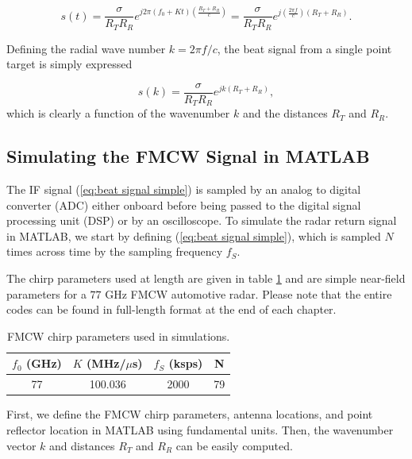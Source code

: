 \begin{equation}
	s(t) = \frac{\sigma}{R_T R_R} e^{j2\pi(f_0 + Kt)(\frac{R_T + R_R}{c})} = \frac{\sigma}{R_T R_R} e^{j(\frac{2\pi f}{c})(R_T + R_R)}.
\end{equation}

Defining the radial wave number $k = 2\pi f/c$, the beat signal from a single point target is simply expressed

\begin{equation}
	\label{eq:beat signal simple}
	s(k) =  \frac{\sigma}{R_T R_R} e^{jk(R_T + R_R)},
\end{equation}
which is clearly a function of the wavenumber $k$ and the distances $R_T$ and $R_R$.



\subsection{Simulating the FMCW Signal in MATLAB}
\label{subsec:simulating the fmcw signal in MATLAB}

The IF signal (\ref{eq:beat signal simple}) is sampled by an analog to digital converter (ADC) either onboard before being passed to the digital signal processing unit (DSP) or by an oscilloscope. To simulate the radar return signal in MATLAB, we start by defining (\ref{eq:beat signal simple}), which is sampled $N$ times across time by the sampling frequency $f_S$. 

The chirp parameters used at length are given in table \ref{table:fmcw parameters} and are simple near-field parameters for a $77$ GHz FMCW automotive radar. Please note that the entire codes can be found in full-length format at the end of each chapter.

\begin{table}[h!]
	\centering
	\begin{tabular}{||c c c c||} 
		\hline
		$f_0$ (GHz) & $K$ (MHz/$\mu$s) & $f_S$ (ksps) & N \\ [0.5ex] 
		\hline\hline
		77 & 100.036 & 2000 & 79 \\ 
		\hline
	\end{tabular}
	\caption{FMCW chirp parameters used in simulations.}
	\label{table:fmcw parameters}
\end{table}

First, we define the FMCW chirp parameters, antenna locations, and point reflector location in MATLAB using fundamental units. Then, the wavenumber vector $k$ and distances $R_T$ and $R_R$ can be easily computed. 

